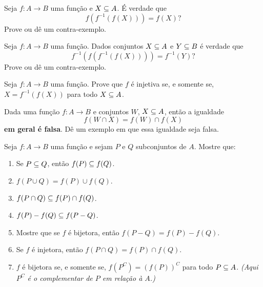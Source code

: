 \documentclass[12pt]{exam}
\begin{document}
    \vspace{.3cm}

    \questao{} Seja $f : A \to B$ uma fun\c{c}\~ao e $X \subseteq A$. \'E verdade que
    \[
        f(f^{-1}(f(X))) = f(X)?
    \]
    Prove ou d\^e um contra-exemplo.

    \vspace{.3cm}

    \questao{} Seja $f : A \to B$ uma fun\c{c}\~ao. Dados conjuntos $X \subseteq A$ e $Y \subseteq B$ \'e verdade que
    \[
        f^{-1}(f(f^{-1}(f(X)))) = f^{-1}(Y)?
    \]
    Prove ou d\^e um contra-exemplo.

    \vspace{.3cm}

    \questao{} Seja $f : A \to B$ uma fun\c{c}\~ao. Prove que $f$ \'e injetiva se, e somente se, $X = f^{-1}(f(X))$ para todo $X \subseteq A$.

    \vspace{.3cm}

    \questao{} Dada uma fun\c{c}\~ao $f : A \to B$ e conjuntos $W$, $X \subseteq A$, ent\~ao a igualdade
    \[
        f(W \cap X) = f(W) \cap f(X)
    \]
    \textbf{em geral \'e falsa}. D\^e um exemplo em que essa igualdade seja falsa.

    \vspace{.3cm}

    \questao{} Seja $f : A \to B$ uma fun\c{c}\~ao e sejam $P$ e $Q$ subconjuntos de $A$. Mostre que:
    \begin{enumerate}[label={\alph*})]
        \item Se $P\subseteq Q$, ent{\~a}o $f(P)\subseteq f(Q)$.
        \item $f(P\cup Q) = f(P)\cup f(Q)$.

        \item $f(P\cap Q)\subseteq f(P)\cap f(Q)$.

        \item $f(P) - f(Q) \subseteq f(P - Q)$.

        \item Mostre que se $f$ é bijetora, então $f(P - Q) = f(P) - f(Q)$.

        \item Se $f$ {\'e} injetora, ent{\~a}o $f(P\cap Q) =  f(P)\cap f(Q)$.

        \item $f$ {\'e} bijetora se, e somente se, $f(P^C) = (f(P))^C$ para todo $P \subseteq A$. \textit{(Aqui $P^C$ \'e o complementar de $P$ em rela\c{c}\~ao \`a $A$.)}
    \end{enumerate}
\end{document}
